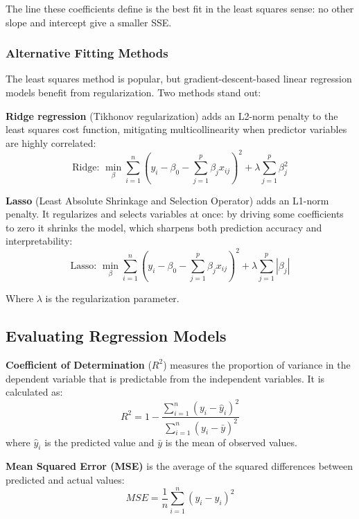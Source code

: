 The line these coefficients define is the best fit in the least squares sense: no other slope and intercept give a smaller SSE.

\subsubsection{Alternative Fitting Methods}
The least squares method is popular, but gradient-descent-based linear regression models benefit from regularization. Two methods stand out:

\textbf{Ridge regression} (Tikhonov regularization) adds an L2-norm penalty to the least squares cost function, mitigating multicollinearity when predictor variables are highly correlated:
\begin{equation}
\text{Ridge: } \min_{\beta} \sum_{i=1}^{n} (y_i - \beta_0 - \sum_{j=1}^{p} \beta_j x_{ij})^2 + \lambda \sum_{j=1}^{p} \beta_j^2
\end{equation}

\textbf{Lasso} (Least Absolute Shrinkage and Selection Operator) adds an L1-norm penalty. It regularizes and selects variables at once: by driving some coefficients to zero it shrinks the model, which sharpens both prediction accuracy and interpretability:
\begin{equation}
\text{Lasso: } \min_{\beta} \sum_{i=1}^{n} (y_i - \beta_0 - \sum_{j=1}^{p} \beta_j x_{ij})^2 + \lambda \sum_{j=1}^{p} |\beta_j|
\end{equation}

Where \(\lambda\) is the regularization parameter.

\subsection{Evaluating Regression Models}

\begin{definition}
\textbf{Coefficient of Determination} (\(R^2\)) measures the proportion of variance in the dependent variable that is predictable from the independent variables. It is calculated as:
\begin{equation}
R^2 = 1 - \frac{\sum_{i=1}^{n} (y_i - \hat{y}_i)^2}{\sum_{i=1}^{n} (y_i - \bar{y})^2}
\end{equation}
where \( \hat{y}_i \) is the predicted value and \( \bar{y} \) is the mean of observed values.
\end{definition}

\begin{definition}
\textbf{Mean Squared Error (MSE)} is the average of the squared differences between predicted and actual values:
\begin{equation}
MSE = \frac{1}{n} \sum_{i=1}^{n} (y_i - \hat{y}_i)^2
\end{equation}
\end{definition}

